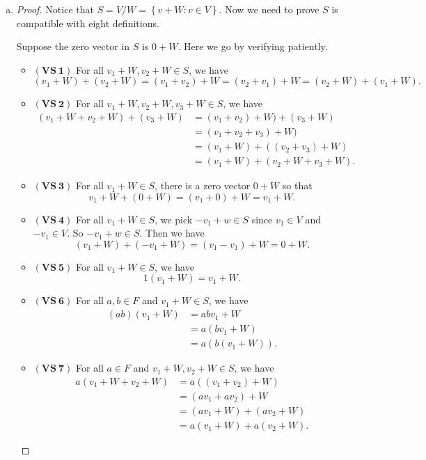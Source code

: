 \begin{Exercise}
\begin{enumerate}[(a)]
\begin{proof}
			Hence we conclude the two operations are well defined.
		\end{proof}
		
		\item
		\begin{proof}
			Notice that $S=V/W=\left\{v+W:v\in V\right\}$. Now we need to prove $S$ is compatible with eight definitions.
			
			Suppose the zero vector in $S$ is $0+W$. Here we go by verifying patiently.
			
			\begin{itemize}
				\item $\mathbf{(VS\ 1)}$
				For all $v_1+W,v_2+W \in S$, we have
				$$
				(v_1+W)+(v_2+W)
				= (v_1+v_2)+W
				= (v_2+v_1)+W
				= (v_2+W)+(v_1+W).
				$$
				
				\item $\mathbf{(VS\ 2)}$
				For all $v_1+W,v_2+W,v_3+W\in S$, we have
				\begin{align*}
					(v_1+W+v_2+W)+(v_3+W)
					&= (v_1+v_2)+W)+(v_3+W) \\
					&= (v_1+v_2+v_3)+W) \\
					&= (v_1+W) + ((v_2+v_3)+W) \\
					&= (v_1+W) + (v_2+W+v_3+W).
				\end{align*}
				
				\item $\mathbf{(VS\ 3)}$
				For all $v_1+W\in S$, there is a zero vector $0+W$ so that
				$$
				v_1+W+(0+W)
				= (v_1+0)+W
				= v_1+W.
				$$
				
				\item $\mathbf{(VS\ 4)}$
				For all $v_1+W\in S$, we pick $-v_1+w\in S$ since $v_1\in V$ and $-v_1\in V$. So $-v_1+w\in S$. Then we have
				$$
				(v_1+W)+(-v_1+W)
				= (v_1-v_1)+W
				= 0+W.
				$$
				
				\item $\mathbf{(VS\ 5)}$
				For all $v_1+W\in S$, we have
				$$
				1(v_1+W)
				= v_1+W.
				$$
				
				\item $\mathbf{(VS\ 6)}$
				For all $a,b\in F$ and $v_1+W\in S$, we have
				\begin{align*}
					(ab)(v_1+W)
					&= ab v_1 + W \\
					&= a(b v_1+W) \\
					&= a(b(v_1+W)).
				\end{align*}
				
				\item $\mathbf{(VS\ 7)}$
				For all $a\in F$ and $v_1+W,v_2+W\in S$, we have
				\begin{align*}
					a(v_1+W+v_2+W)
					&= a((v_1+v_2)+W) \\
					&= (a v_1 + a v_2) + W \\
					&= (a v_1 + W) + (a v_2 + W)\\
					&= a(v_1 + W)+a(v_2 + W).
				\end{align*}
				

\end{itemize}
\end{proof}
\end{enumerate}
\end{Exercise}
